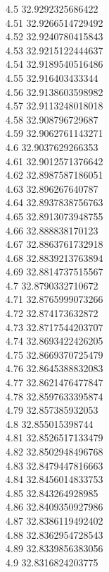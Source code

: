 {4.5	32.9292325686422\\
4.51	32.9266514729492\\
4.52	32.9240780415843\\
4.53	32.9215122444637\\
4.54	32.9189540516486\\
4.55	32.916403433344\\
4.56	32.9138603598982\\
4.57	32.9113248018018\\
4.58	32.908796729687\\
4.59	32.9062761143271\\
4.6	32.9037629266353\\
4.61	32.9012571376642\\
4.62	32.8987587186051\\
4.63	32.896267640787\\
4.64	32.8937838756763\\
4.65	32.8913073948755\\
4.66	32.888838170123\\
4.67	32.8863761732918\\
4.68	32.8839213763894\\
4.69	32.8814737515567\\
4.7	32.8790332710672\\
4.71	32.8765999073266\\
4.72	32.874173632872\\
4.73	32.8717544203707\\
4.74	32.8693422426205\\
4.75	32.8669370725479\\
4.76	32.8645388832083\\
4.77	32.8621476477847\\
4.78	32.8597633395874\\
4.79	32.857385932053\\
4.8	32.855015398744\\
4.81	32.8526517133479\\
4.82	32.8502948496768\\
4.83	32.8479447816663\\
4.84	32.8456014833753\\
4.85	32.843264928985\\
4.86	32.8409350927986\\
4.87	32.8386119492402\\
4.88	32.8362954728543\\
4.89	32.8339856383056\\
4.9	32.8316824203775\\
}
